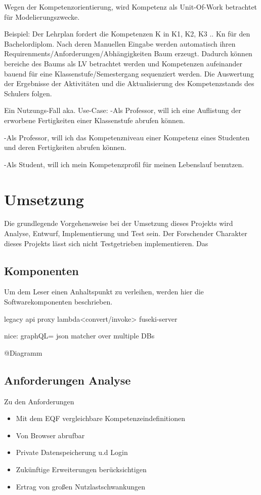 \documentclass[
12pt,
english,
ngerman,
headsepline,
twoside,
openright,
numbers=noenddot,version=first
]{scrreprt}
\begin{document}
Wegen der Kompetenzorientierung, wird Kompetenz als Unit-Of-Work betrachtet für Modelierungszwecke.

Beispiel:
Der Lehrplan fordert die Kompetenzen K in K1, K2, K3 .. Kn für den Bachelordiplom. Nach deren Manuellen Eingabe werden automatisch
ihren Requirenments/Anforderungen/Abhängigkeiten Baum erzeugt. Dadurch können bereiche des Baums als LV betrachtet werden und Kompetenzen aufeinander
bauend für eine Klassenstufe/Semestergang sequenziert werden. Die Auswertung der Ergebnisse der Aktivitäten und die Aktualisierung des Kompetenzstands
des Schulers folgen.

Ein Nutzungs-Fall aka. Use-Case:
-Als Professor, will ich eine Auflistung der erworbene Fertigkeiten einer Klassenstufe abrufen können.

-Als Professor, will ich das Kompetenzniveau einer Kompetenz eines Studenten und deren Fertigkeiten abrufen können.

-Als Student, will ich mein Kompetenzprofil für meinen Lebenslauf benutzen.

\chapter{Umsetzung}
Die grundlegende Vorgehensweise bei der Umsetzung dieses Projekts wird Analyse, Entwurf, Implementierung und Test sein. Der Forschender Charakter dieses Projekts lässt sich nicht Testgetrieben implementieren.
Das

\section{Komponenten}

Um dem Leser einen Anhaltspunkt zu verleihen, werden hier die Softwarekomponenten beschrieben.

legacy api proxy\cite{sbarski2017serverless}
lambda<convert/invoke> fuseki-server\label{komponenten:fuseki}

nice: graphQL= json matcher over multiple DBs

@Diagramm

\section{Anforderungen Analyse}

Zu den Anforderungen
\begin{itemize}
\item Mit dem EQF vergleichbare Kompetenzeindefinitionen
\item Von Browser abrufbar
\item Private Datenspeicherung u.d Login
\item Zukünftige Erweiterungen berücksichtigen
\item Ertrag von großen Nutzlastschwankungen
\end{itemize}
\end{document}
